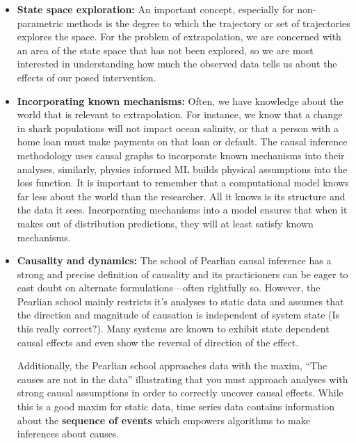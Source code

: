 \documentclass{article}
\begin{document}
        \begin{itemize}
            \item \textbf{State space exploration:} An important concept, especially for non-parametric methods is the degree to 
            which the trajectory or set of trajectories explores the space. For the problem of extrapolation, we are concerned with
            an area of the state space that has not been explored, so we are most interested in understanding how much the
            observed data tells us about the effects of our posed intervention.

            \item \textbf{Incorporating known mechanisms:} Often, we have knowledge about the world that is relevant to
            extrapolation. For instance, we know that a change in shark populations will not impact ocean salinity, or that
            a person with a home loan must make payments on that loan or default. The causal inference methodology uses
            causal graphs to incorporate known mechanisms into their analyses, similarly, physics informed ML builds
            physical assumptions into the loss function. It is important to remember that a computational model knows far
            less about the world than the researcher. All it knows is its structure and the data it sees. Incorporating
            mechanisms into a model ensures that when it makes out of distribution predictions, they will at least
            satisfy known mechanisms.

            \item \textbf{Causality and dynamics:} The school of Pearlian causal inference has a strong and precise definition of
            causality and its practicioners can be eager to cast doubt on alternate formulations---often rightfully so.
            However, the Pearlian school mainly restricts it's analyses to static data and assumes that the direction and
            magnitude of causation is independent of system state (Is this really correct?). Many systems are known to
            exhibit state dependent causal effects and even show the reversal of direction of the effect.

            Additionally, the Pearlian school approaches data with the maxim, ``The causes are not in the data'' illustrating
            that you must approach analyses with strong causal assumptions in order to correctly uncover causal effects.
            While this is a good maxim for static data, time series data contains information about the \textbf{sequence of events}
            which empowers algorithms to make inferences about causes.


\end{itemize}
\end{document}
